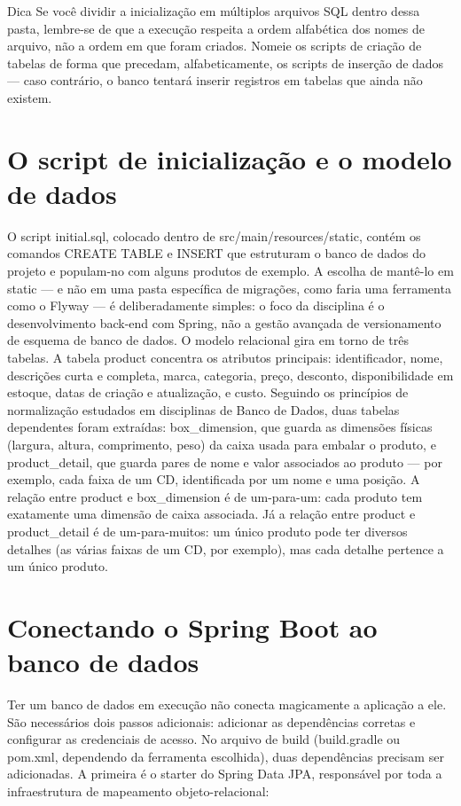 \begin{infobox}{Dica}
Se você dividir a inicialização em múltiplos arquivos SQL dentro dessa pasta, lembre-se de que a execução respeita a ordem alfabética dos nomes de arquivo, não a ordem em que foram criados. Nomeie os scripts de criação de tabelas de forma que precedam, alfabeticamente, os scripts de inserção de dados — caso contrário, o banco tentará inserir registros em tabelas que ainda não existem.
\end{infobox}

\section{O script de inicialização e o modelo de dados}

O script initial.sql, colocado dentro de src/main/resources/static, contém os comandos CREATE TABLE e INSERT que estruturam o banco de dados do projeto e populam-no com alguns produtos de exemplo. A escolha de mantê-lo em static — e não em uma pasta específica de migrações, como faria uma ferramenta como o Flyway — é deliberadamente simples: o foco da disciplina é o desenvolvimento back-end com Spring, não a gestão avançada de versionamento de esquema de banco de dados. O modelo relacional gira em torno de três tabelas. A tabela product concentra os atributos principais: identificador, nome, descrições curta e completa, marca, categoria, preço, desconto, disponibilidade em estoque, datas de criação e atualização, e custo. Seguindo os princípios de normalização estudados em disciplinas de Banco de Dados, duas tabelas dependentes foram extraídas: box\_dimension, que guarda as dimensões físicas (largura, altura, comprimento, peso) da caixa usada para embalar o produto, e product\_detail, que guarda pares de nome e valor associados ao produto — por exemplo, cada faixa de um CD, identificada por um nome e uma posição. A relação entre product e box\_dimension é de um-para-um: cada produto tem exatamente uma dimensão de caixa associada. Já a relação entre product e product\_detail é de um-para-muitos: um único produto pode ter diversos detalhes (as várias faixas de um CD, por exemplo), mas cada detalhe pertence a um único produto.

\section{Conectando o Spring Boot ao banco de dados}

Ter um banco de dados em execução não conecta magicamente a aplicação a ele. São necessários dois passos adicionais: adicionar as dependências corretas e configurar as credenciais de acesso. No arquivo de build (build.gradle ou pom.xml, dependendo da ferramenta escolhida), duas dependências precisam ser adicionadas. A primeira é o starter do Spring Data JPA, responsável por toda a infraestrutura de mapeamento objeto-relacional:

